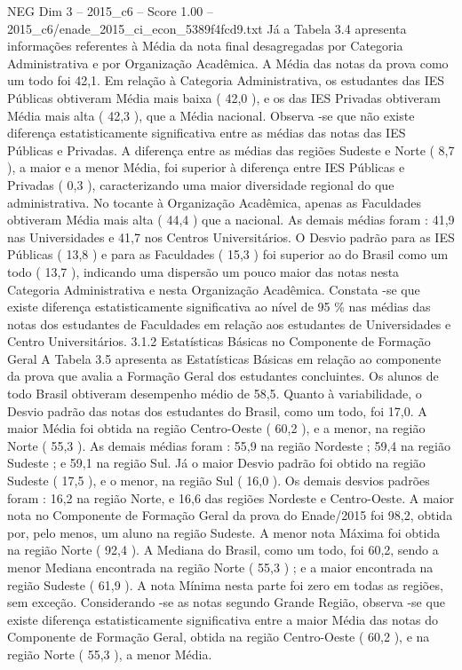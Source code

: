 \begin{textsample}{NEG Dim 3 – 2015\_c6 – Score 1.00 – 2015\_c6/enade\_2015\_ci\_econ\_5389f4fcd9.txt}
Já a Tabela 3.4 apresenta informações referentes à Média da nota final desagregadas por Categoria Administrativa e por Organização Acadêmica.
A Média das notas da prova como um todo foi 42,1.
Em relação à Categoria Administrativa, os estudantes das IES Públicas obtiveram Média mais baixa ( 42,0 ), e os das IES Privadas obtiveram Média mais alta ( 42,3 ), que a Média nacional.
Observa -se que não existe diferença estatisticamente significativa entre as médias das notas das IES Públicas e Privadas.
A diferença entre as médias das regiões Sudeste e Norte ( 8,7 ), a maior e a menor Média, foi superior à diferença entre IES Públicas e Privadas ( 0,3 ), caracterizando uma maior diversidade regional do que administrativa.
No tocante à Organização Acadêmica, apenas as Faculdades obtiveram Média mais alta ( 44,4 ) que a nacional.
As demais médias foram : 41,9 nas Universidades e 41,7 nos Centros Universitários.
O Desvio padrão para as IES Públicas ( 13,8 ) e para as Faculdades ( 15,3 ) foi superior ao do Brasil como um todo ( 13,7 ), indicando uma dispersão um pouco maior das notas nesta Categoria Administrativa e nesta Organização Acadêmica.
Constata -se que existe diferença estatisticamente significativa ao nível de 95 \% nas médias das notas dos estudantes de Faculdades em relação aos estudantes de Universidades e Centro Universitários. 3.1.2 Estatísticas Básicas no Componente de Formação Geral A Tabela 3.5 apresenta as Estatísticas Básicas em relação ao componente da prova que avalia a Formação Geral dos estudantes concluintes.
Os alunos de todo Brasil obtiveram desempenho médio de 58,5.
Quanto à variabilidade, o Desvio padrão das notas dos estudantes do Brasil, como um todo, foi 17,0.
A maior Média foi obtida na região Centro-Oeste ( 60,2 ), e a menor, na região Norte ( 55,3 ).
As demais médias foram : 55,9 na região Nordeste ; 59,4 na região Sudeste ; e 59,1 na região Sul.
Já o maior Desvio padrão foi obtido na região Sudeste ( 17,5 ), e o menor, na região Sul ( 16,0 ).
Os demais desvios padrões foram : 16,2 na região Norte, e 16,6 das regiões Nordeste e Centro-Oeste.
A maior nota no Componente de Formação Geral da prova do Enade/2015 foi 98,2, obtida por, pelo menos, um aluno na região Sudeste.
A menor nota Máxima foi obtida na região Norte ( 92,4 ).
A Mediana do Brasil, como um todo, foi 60,2, sendo a menor Mediana encontrada na região Norte ( 55,3 ) ; e a maior encontrada na região Sudeste ( 61,9 ).
A nota Mínima nesta parte foi zero em todas as regiões, sem exceção.
Considerando -se as notas segundo Grande Região, observa -se que existe diferença estatisticamente significativa entre a maior Média das notas do Componente de Formação Geral, obtida na região Centro-Oeste ( 60,2 ), e na região Norte ( 55,3 ), a menor Média.

\end{textsample}

